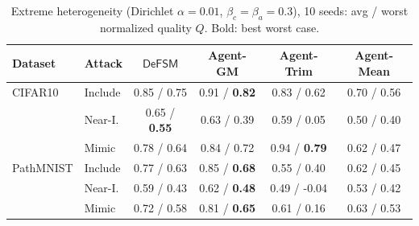 \begin{table}[t]
\centering\footnotesize
\setlength{\tabcolsep}{2.5pt}
\caption{Extreme heterogeneity (Dirichlet $\alpha=0.01$, $\beta_c=\beta_a=0.3$), 10 seeds: avg / worst normalized quality $Q$. Bold: best worst case.}
\label{tab:hetero}
\begin{tabular}{llcccc}
\toprule
Dataset & Attack & $\mathsf{DeFSM}$ & Agent-GM & Agent-Trim & Agent-Mean\\
\midrule
CIFAR10 & Include & 0.85 / 0.75 & 0.91 / \textbf{0.82} & 0.83 / 0.62 & 0.70 / 0.56\\
 & Near-I. & 0.65 / \textbf{0.55} & 0.63 / 0.39 & 0.59 / 0.05 & 0.50 / 0.40\\
 & Mimic & 0.78 / 0.64 & 0.84 / 0.72 & 0.94 / \textbf{0.79} & 0.62 / 0.47\\
\midrule
PathMNIST & Include & 0.77 / 0.63 & 0.85 / \textbf{0.68} & 0.55 / 0.40 & 0.62 / 0.45\\
 & Near-I. & 0.59 / 0.43 & 0.62 / \textbf{0.48} & 0.49 / -0.04 & 0.53 / 0.42\\
 & Mimic & 0.72 / 0.58 & 0.81 / \textbf{0.65} & 0.61 / 0.16 & 0.63 / 0.53\\
\bottomrule
\end{tabular}
\end{table}
